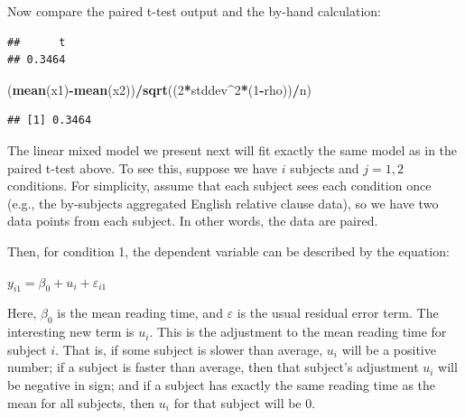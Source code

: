 \documentclass[12pt,]{krantz}
\newenvironment{Shaded}{\begin{snugshade}}{\end{snugshade}}
\newcommand{\DataTypeTok}[1]{\textcolor[rgb]{0.13,0.29,0.53}{#1}}
\newcommand{\DecValTok}[1]{\textcolor[rgb]{0.00,0.00,0.81}{#1}}
\newcommand{\KeywordTok}[1]{\textcolor[rgb]{0.13,0.29,0.53}{\textbf{#1}}}
\newcommand{\NormalTok}[1]{#1}
\newcommand{\OperatorTok}[1]{\textcolor[rgb]{0.81,0.36,0.00}{\textbf{#1}}}
\newcommand{\OtherTok}[1]{\textcolor[rgb]{0.56,0.35,0.01}{#1}}
\begin{document}
Now compare the paired t-test output and the by-hand calculation:

\begin{Shaded}
\end{Shaded}

\begin{verbatim}
##      t 
## 0.3464
\end{verbatim}

\begin{Shaded}
\begin{Highlighting}[]
\NormalTok{(}\KeywordTok{mean}\NormalTok{(x1)}\OperatorTok{-}\KeywordTok{mean}\NormalTok{(x2))}\OperatorTok{/}\KeywordTok{sqrt}\NormalTok{((}\DecValTok{2}\OperatorTok{*}\NormalTok{stddev}\OperatorTok{^}\DecValTok{2}\OperatorTok{*}\NormalTok{(}\DecValTok{1}\OperatorTok{-}\NormalTok{rho))}\OperatorTok{/}\NormalTok{n)}
\end{Highlighting}
\end{Shaded}

\begin{verbatim}
## [1] 0.3464
\end{verbatim}

The linear mixed model we present next will fit exactly the same model as in the paired t-test above. To see this, suppose we have \(i\) subjects and \(j=1,2\) conditions. For simplicity, assume that each subject sees each condition once (e.g., the by-subjects aggregated English relative clause data), so we have two data points from each subject. In other words, the data are paired.

Then, for condition 1, the dependent variable can be described by the equation:

\(y_{i1} = \beta_0 + u_i + \varepsilon_{i1}\)

Here, \(\beta_0\) is the mean reading time, and \(\varepsilon\) is the usual residual error term. The interesting new term is \(u_i\). This is the adjustment to the mean reading time for subject \(i\). That is, if some subject is slower than average, \(u_i\) will be a positive number; if a subject is faster than average, then that subject's adjustment \(u_i\) will be negative in sign; and if a subject has exactly the same reading time as the mean for all subjects, then \(u_i\) for that subject will be 0.
\end{document}
